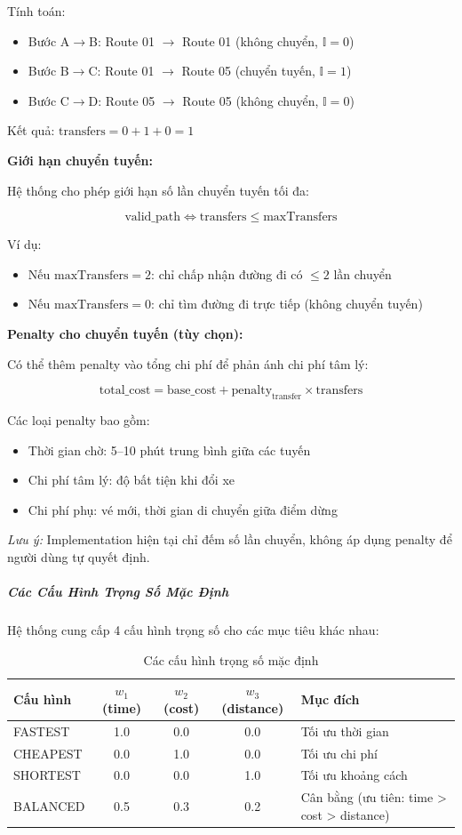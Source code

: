Tính toán:
\begin{itemize}
    \item Bước A$\rightarrow$B: Route 01 $\rightarrow$ Route 01 (không chuyển, $\mathbb{I} = 0$)
    \item Bước B$\rightarrow$C: Route 01 $\rightarrow$ Route 05 (chuyển tuyến, $\mathbb{I} = 1$)
    \item Bước C$\rightarrow$D: Route 05 $\rightarrow$ Route 05 (không chuyển, $\mathbb{I} = 0$)
\end{itemize}

Kết quả: $\text{transfers} = 0 + 1 + 0 = 1$

\textbf{Giới hạn chuyển tuyến:}

Hệ thống cho phép giới hạn số lần chuyển tuyến tối đa:

\[
\text{valid\_path} \Longleftrightarrow \text{transfers} \leq \text{maxTransfers}
\]

Ví dụ:
\begin{itemize}
    \item Nếu $\text{maxTransfers} = 2$: chỉ chấp nhận đường đi có $\leq 2$ lần chuyển
    \item Nếu $\text{maxTransfers} = 0$: chỉ tìm đường đi trực tiếp (không chuyển tuyến)
\end{itemize}

\textbf{Penalty cho chuyển tuyến (tùy chọn):}

Có thể thêm penalty vào tổng chi phí để phản ánh chi phí tâm lý:

\[
\text{total\_cost} = \text{base\_cost} + \text{penalty}_{\text{transfer}} \times \text{transfers}
\]

Các loại penalty bao gồm:
\begin{itemize}
    \item Thời gian chờ: 5--10 phút trung bình giữa các tuyến
    \item Chi phí tâm lý: độ bất tiện khi đổi xe
    \item Chi phí phụ: vé mới, thời gian di chuyển giữa điểm dừng
\end{itemize}

\textit{Lưu ý:} Implementation hiện tại chỉ đếm số lần chuyển, không áp dụng penalty để người dùng tự quyết định.

\subparagraph{Các Cấu Hình Trọng Số Mặc Định}

Hệ thống cung cấp 4 cấu hình trọng số cho các mục tiêu khác nhau:

\begin{table}[h]
\centering
\begin{tabular}{|l|c|c|c|l|}
\hline
\textbf{Cấu hình} & $w_1$ (time) & $w_2$ (cost) & $w_3$ (distance) & \textbf{Mục đích} \\
\hline
FASTEST & 1.0 & 0.0 & 0.0 & Tối ưu thời gian \\
CHEAPEST & 0.0 & 1.0 & 0.0 & Tối ưu chi phí \\
SHORTEST & 0.0 & 0.0 & 1.0 & Tối ưu khoảng cách \\
BALANCED & 0.5 & 0.3 & 0.2 & Cân bằng (ưu tiên: time > cost > distance) \\
\hline
\end{tabular}
\caption{Các cấu hình trọng số mặc định}
\end{table}


